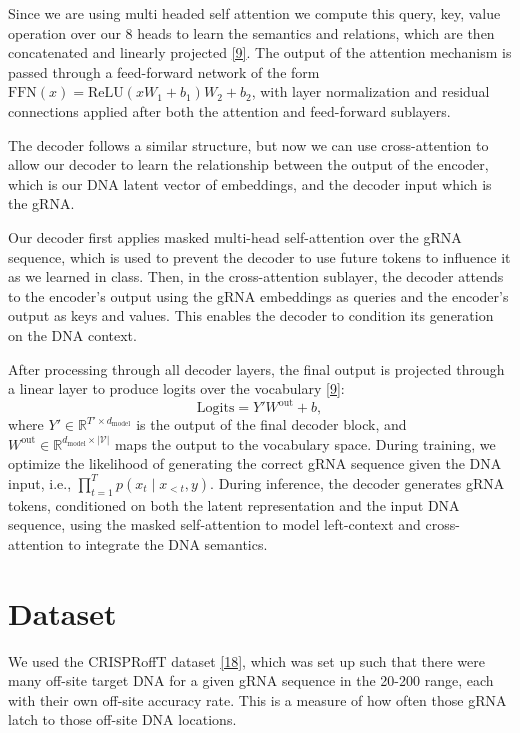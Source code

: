 \documentclass{article}
\begin{document}
Since we are using multi headed self attention we compute this query, key, value operation over our 8 heads to learn the semantics and relations, which are then concatenated and linearly projected \hyperref[Reference 9]{[9]}. The output of the attention mechanism is passed through a feed-forward network of the form $\text{FFN}(x) = \text{ReLU}(xW_1 + b_1)W_2 + b_2$, with layer normalization and residual connections applied after both the attention and feed-forward sublayers.

The decoder follows a similar structure, but now we can use cross-attention to allow our decoder to learn the relationship between the output of the encoder, which is our DNA latent vector of embeddings, and the decoder input which is the gRNA. 

Our decoder first applies masked multi-head self-attention over the gRNA sequence, which is used to prevent the decoder to use future tokens to influence it as we learned in class. Then, in the cross-attention sublayer, the decoder attends to the encoder’s output using the gRNA embeddings as queries and the encoder’s output as keys and values. This enables the decoder to condition its generation on the DNA context. 

After processing through all decoder layers, the final output is projected through a linear layer to produce logits over the vocabulary \hyperref[Reference 9]{[9]}:
\[
\text{Logits} = Y'W^{\text{out}} + b,
\]
where $Y' \in \mathbb{R}^{T' \times d_{\text{model}}}$ is the output of the final decoder block, and $W^{\text{out}} \in \mathbb{R}^{d_{\text{model}} \times |\mathcal{V}|}$ maps the output to the vocabulary space. During training, we optimize the likelihood of generating the correct gRNA sequence given the DNA input, i.e., $\prod_{t=1}^{T} p(x_t \mid x_{<t}, y)$. During inference, the decoder generates gRNA tokens, conditioned on both the latent representation and the input DNA sequence, using the masked self-attention to model left-context and cross-attention to integrate the DNA semantics.


\section{Dataset}
We used the CRISPRoffT dataset \hyperref[Reference 18]{[18]}, which was set up such that there were many off-site target DNA for a given gRNA sequence in the 20-200 range, each with their own off-site accuracy rate. This is a measure of how often those gRNA latch to those off-site DNA locations.
\end{document}
